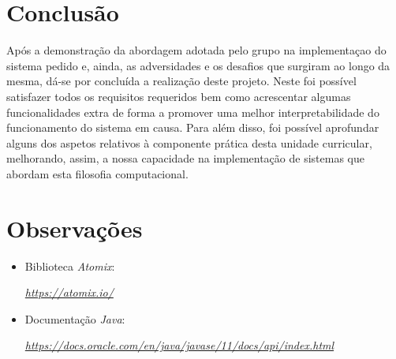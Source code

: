 \documentclass[a4paper]{report}
\begin{document}
\chapter{Conclusão}
\large{
	Após a demonstração da abordagem adotada pelo grupo na implementaçao do sistema pedido e, ainda, as adversidades e os desafios que surgiram ao longo da mesma, dá-se por concluída a realização deste projeto. Neste foi possível satisfazer todos os requisitos requeridos bem como acrescentar algumas funcionalidades extra de forma a promover uma melhor interpretabilidade do funcionamento do sistema em causa.
	Para além disso, foi possível aprofundar alguns dos aspetos relativos à componente prática desta unidade curricular, melhorando, assim, a nossa capacidade na implementação de sistemas que abordam esta filosofia computacional.
}

\appendix
\chapter{Observações}
\begin{itemize}
	\item Biblioteca \textit{Atomix}:
	\par \textit{\url{https://atomix.io/}}
	\item Documentação \textit{Java}:
	\par \textit{\url{https://docs.oracle.com/en/java/javase/11/docs/api/index.html}}
\end{itemize}
\end{document}
